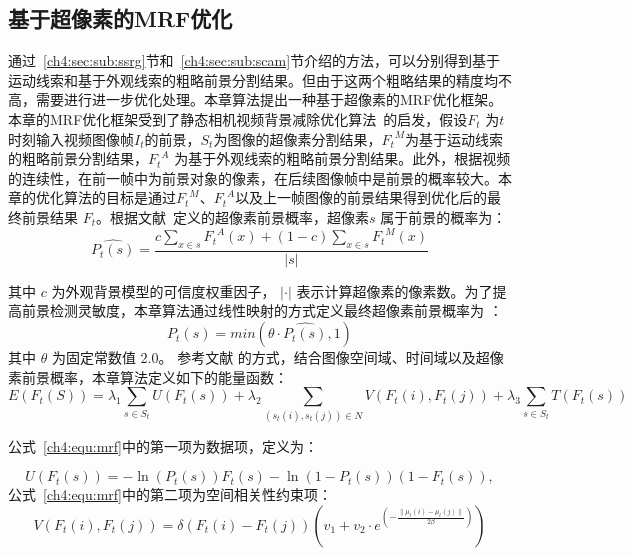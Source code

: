 \subsection{基于超像素的MRF优化}
\label {ch4:sec:MRF}

通过~\ref{ch4:sec:sub:ssrg}节和~\ref{ch4:sec:sub:scam}节介绍的方法，可以分别得到基于运动线索和基于外观线索的粗略前景分割结果。但由于这两个粗略结果的精度均不高，需要进行进一步优化处理。本章算法提出一种基于超像素的MRF优化框架。本章的MRF优化框架受到了静态相机视频背景减除优化算法~\cite{MRF}的启发，假设${F}_{t}$ 为$t$ 时刻输入视频图像帧${I}_{t}$的前景，$S_{t}$为图像的超像素分割结果，${{F}_{t}}^{M}$为基于运动线索的粗略前景分割结果，${F_{t}}^{A}$ 为基于外观线索的粗略前景分割结果。此外，根据视频的连续性，在前一帧中为前景对象的像素，在后续图像帧中是前景的概率较大。本章的优化算法的目标是通过${{F}_{t}}^{M}$、${{F}_{t}}^{A}$以及上一帧图像的前景结果得到优化后的最终前景结果 $F_{t}$。根据文献~定义的超像素前景概率，超像素$s$ 属于前景的概率为：
\begin{equation}
\label{ch4:equ:fgprop}
\hat{P_{t}(s)} = \frac{c\sum_{x \in s}{F_{t}}^{A}(x) + (1-c)\sum_{x \in s}{F_{t}}^{M}(x)}{\vert s \vert}
\end{equation}



 其中 $c$ 为外观背景模型的可信度权重因子， $\vert\cdot\vert$ 表示计算超像素的像素数。为了提高前景检测灵敏度，本章算法通过线性映射的方式定义最终超像素前景概率为 ：
$$P_{t}(s) = min(\theta \cdot \hat{P_{t}(s)},1)$$
其中 $\theta$ 为固定常数值 $2.0$。 参考文献 的方式，结合图像空间域、时间域以及超像素前景概率，本章算法定义如下的能量函数：
\begin{equation}
\label{ch4:equ:mrf}
E(F_{t}(S)) = \lambda_{1}\sum_{s \in S_{t}}{U(F_{t}(s))} + \lambda_{2}\sum_{(s_{t}(i),s_{t}(j))\in N}{V(F_{t}(i),F_{t}(j))} + \lambda_{3}\sum_{s \in S_{t}}{T(F_{t}(s))}
\end{equation}



公式~\ref{ch4:equ:mrf}中的第一项为数据项，定义为：

$$ U(F_{t}(s)) = -\ln(P_{t}(s))F_{t}(s) - \ln(1-P_{t}(s))(1-F_{t}(s)), $$
公式~\ref{ch4:equ:mrf}中的第二项为空间相关性约束项：
\begin{equation}
\label{ch4:equ:mrfSpace}
V(F_{t}(i),F_{t}(j)) = \delta( F_{t}(i) - F_{t}(j)) (v_{1} + v_{2}\cdot e^{(-\frac{\parallel \mu_{t}(i) - \mu_{t}(j)\parallel}{2\beta})})
\end{equation}

